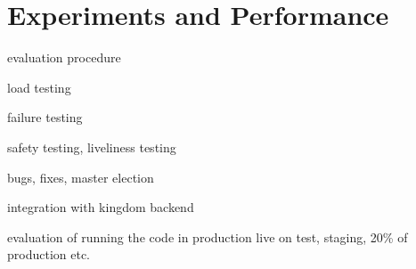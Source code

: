 \chapter{Experiments and Performance}
\label{experiments.performance}


evaluation procedure

load testing

failure testing

safety testing, liveliness testing

bugs, fixes, master election

integration with kingdom backend

evaluation of running the code in production
  live on test, staging, 20\% of production etc.

